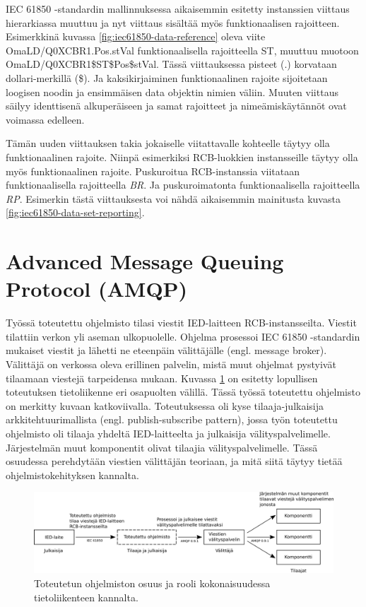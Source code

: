 IEC 61850 -standardin mallinnuksessa aikaisemmin esitetty instanssien viittaus hierarkiassa muuttuu ja nyt viittaus sisältää myös funktionaalisen rajoitteen. Esimerkkinä kuvassa \ref{fig:iec61850-data-reference} oleva viite OmaLD/Q0XCBR1.Pos.stVal funktionaalisella rajoitteella ST, muuttuu muotoon OmaLD/Q0XCBR1\$ST\$Pos\$stVal. Tässä viittauksessa pisteet (.) korvataan dollari-merkillä (\$). Ja kaksikirjaiminen funktionaalinen rajoite sijoitetaan loogisen noodin ja ensimmäisen data objektin nimien väliin. Muuten viittaus säilyy identtisenä alkuperäiseen ja samat rajoitteet ja nimeämiskäytännöt ovat voimassa edelleen. \mbox{\cite[s.~34--35, 111]{IEC61850-8-1}}

Tämän uuden viittauksen takia jokaiselle viitattavalle kohteelle täytyy olla funktionaalinen rajoite. Niinpä esimerkiksi RCB-luokkien instansseille täytyy olla myös funktionaalinen rajoite. Puskuroitua RCB-instanssia viitataan funktionaalisella rajoitteella \emph{BR}. Ja puskuroimatonta funktionaalisella rajoitteella \emph{RP}. Esimerkin tästä viittauksesta voi nähdä aikaisemmin mainitusta kuvasta \ref{fig:iec61850-data-set-reporting}. \mbox{\cite[s.~32--34, 75]{IEC61850-8-1}}


\section{Advanced Message Queuing Protocol (AMQP)}
\label{ch:amqp-theory}
Työssä toteutettu ohjelmisto tilasi viestit IED-laitteen RCB-instansseilta. Viestit tilattiin verkon yli aseman ulkopuolelle. Ohjelma prosessoi IEC 61850 -standardin mukaiset viestit ja lähetti ne eteenpäin välittäjälle (engl. message broker). Välittäjä on verkossa oleva erillinen palvelin, mistä muut ohjelmat pystyivät tilaamaan viestejä tarpeidensa mukaan. Kuvassa \ref{fig:implemented-system-communication} on esitetty lopullisen toteutuksen tietoliikenne eri osapuolten välillä. Tässä työssä toteutettu ohjelmisto on merkitty kuvaan katkoviivalla. Toteutuksessa oli kyse tilaaja-julkaisija arkkitehtuurimallista (engl. publish-subscribe pattern), jossa työn toteutettu ohjelmisto oli tilaaja yhdeltä IED-laitteelta ja julkaisija välityspalvelimelle. Järjestelmän muut komponentit olivat tilaajia välityspalvelimelle. Tässä osuudessa perehdytään viestien välittäjän teoriaan, ja mitä siitä täytyy tietää ohjelmistokehityksen kannalta.

\begin{figure}[ht!]
	\includegraphics[width=1\textwidth]{pictures/implemented-system-communication.png}
	\caption{Toteutetun ohjelmiston osuus ja rooli kokonaisuudessa tietoliikenteen kannalta.}
	\label{fig:implemented-system-communication}
\end{figure}

